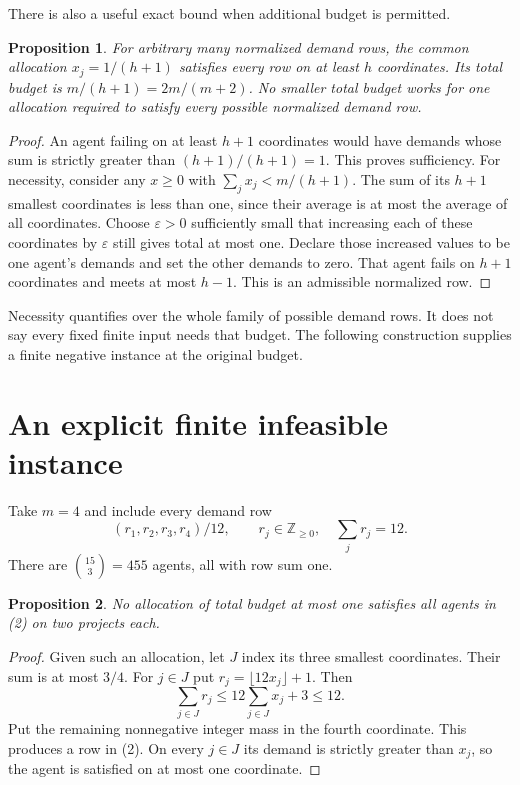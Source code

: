 \documentclass[11pt]{article}
\newtheorem{proposition}{Proposition}
\begin{document}
There is also a useful exact bound when additional budget is permitted.
\begin{proposition}
For arbitrary many normalized demand rows, the common allocation
$x_j=1/(h+1)$ satisfies every row on at least $h$ coordinates. Its total
budget is $m/(h+1)=2m/(m+2)$. No smaller total budget works for one
allocation required to satisfy every possible normalized demand row.
\end{proposition}
\begin{proof}
An agent failing on at least $h+1$ coordinates would have demands whose
sum is strictly greater than $(h+1)/(h+1)=1$. This proves sufficiency.
For necessity, consider any $x\geq0$ with
$\sum_jx_j<m/(h+1)$. The sum of its $h+1$ smallest coordinates is less
than one, since their average is at most the average of all coordinates.
Choose $\varepsilon>0$ sufficiently small that increasing each of these
coordinates by $\varepsilon$ still gives total at most one. Declare
those increased values to be one agent's demands and set the other
demands to zero. That agent fails on $h+1$ coordinates and meets at most
$h-1$. This is an admissible normalized row.
\end{proof}

Necessity quantifies over the whole family of possible demand rows. It
does not say every fixed finite input needs that budget. The following
construction supplies a finite negative instance at the original budget.

\section*{An explicit finite infeasible instance}
Take $m=4$ and include every demand row
\[
 (r_1,r_2,r_3,r_4)/12,
 \qquad r_j\in\mathbb Z_{\geq0},\quad \sum_jr_j=12.
 \tag{2}
\]
There are $\binom{15}{3}=455$ agents, all with row sum one.

\begin{proposition}
No allocation of total budget at most one satisfies all agents in (2)
on two projects each.
\end{proposition}
\begin{proof}
Given such an allocation, let $J$ index its three smallest coordinates.
Their sum is at most $3/4$. For $j\in J$ put
$r_j=\lfloor12x_j\rfloor+1$. Then
\[
 \sum_{j\in J}r_j\leq12\sum_{j\in J}x_j+3\leq12.
\]
Put the remaining nonnegative integer mass in the fourth coordinate.
This produces a row in (2). On every $j\in J$ its demand is strictly
greater than $x_j$, so the agent is satisfied on at most one coordinate.
\end{proof}
\end{document}
